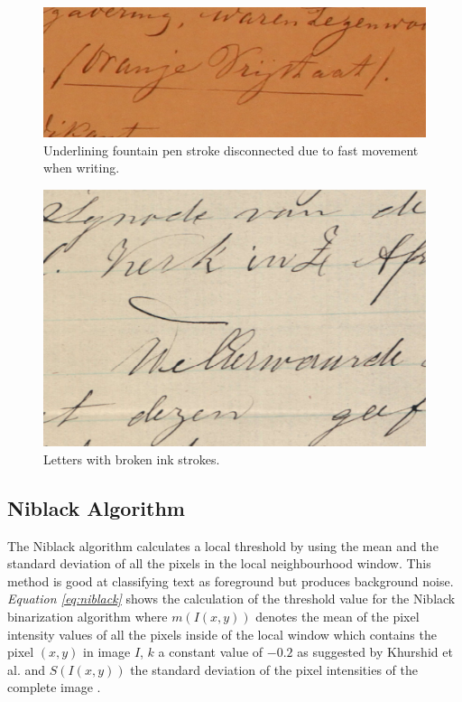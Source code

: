 \documentclass[11pt]{article}
\begin{document}
				\begin{figure}[!htb]
				 \centering
				 \includegraphics[scale=0.4]{stroke.JPG}
				 \caption{Underlining fountain pen stroke disconnected due to fast movement when writing.} %
				 \label{fig:stroke} %
				\end{figure}

				\begin{figure}[!htb]
				 \centering
				 \includegraphics[scale=1]{stroke2.JPG}
				 \caption{Letters with broken ink strokes.} %
				 \label{fig:stroke2} %
				\end{figure}

				\newpage

  		\subsection{Niblack Algorithm}%
  			The Niblack algorithm \cite{niblack1985introduction} calculates a local threshold by using the mean and the standard deviation of all the pixels in the local neighbourhood window. This method is good at classifying text as foreground but produces background noise. \textit{Equation \ref{eq:niblack}} shows the calculation of the threshold value for the Niblack binarization algorithm where $m(I(x, y))$ denotes the mean of the pixel intensity values of all the pixels inside of the local window which contains the pixel $(x, y)$ in image $I$, $k$ a constant value of $-0.2$ as suggested by Khurshid et al. \cite{khurshid2009comparison} and $S(I(x, y))$ the standard deviation of the pixel intensities of the complete image \cite{khurshid2009comparison}.
\end{document}
